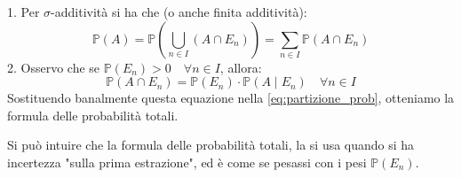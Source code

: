 \begin{teorema}
\begin{dimostrazione}
\begin{center}
\begin{minipage}{0.40\textwidth}
\begin{tikzpicture}[scale=0.8, every node/.style={font=\small}]
\end{tikzpicture}
\end{minipage}
\end{center}

1. Per $\sigma$-additività si ha che (o anche finita additività):
\begin{equation}
   \mathbb{P}(A) = \mathbb{P}\left(\bigcup_{n\in I} (A \cap E_n)\right)=\sum_{n\in I}\mathbb{P}(A\cap E_n)
   \label{eq:partizione_prob}
\end{equation}
2. Osservo che se $\mathbb{P}(E_n)>0\quad \forall n\in I$, allora:
\[
\mathbb{P}(A\cap E_n) = \mathbb{P}(E_n)\cdot\mathbb{P}(A\mid E_n)\quad \forall n\in I
\]
Sostituendo banalmente questa equazione nella \eqref{eq:partizione_prob}, otteniamo la formula delle probabilità totali.
\end{dimostrazione}
\end{teorema}

Si può intuire che la formula delle probabilità totali, la si usa quando si ha incertezza "sulla prima estrazione", ed è come se pesassi con i pesi $\mathbb{P}(E_n)$.

